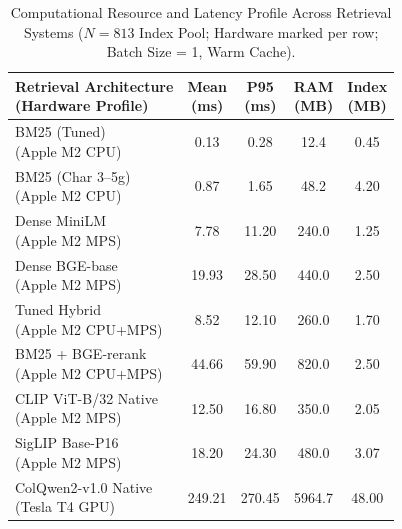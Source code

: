 \begin{table}[t]
\centering
\footnotesize
\caption{Computational Resource and Latency Profile Across Retrieval Systems ($N=813$ Index Pool; Hardware marked per row; Batch Size = 1, Warm Cache).}
\label{tab:system_costs}
\setlength{\tabcolsep}{2.5pt}
\begin{tabular}{@{}p{2.8cm}cccc@{}}
\toprule
\makecell[l]{\textbf{Retrieval Architecture}\\{\scriptsize \textbf{(Hardware Profile)}}} & \makecell{\textbf{Mean}\\\textbf{(ms)}} & \makecell{\textbf{P95}\\\textbf{(ms)}} & \makecell{\textbf{RAM}\\\textbf{(MB)}} & \makecell{\textbf{Index}\\\textbf{(MB)}} \\
\midrule
\makecell[l]{BM25 (Tuned)\\{\scriptsize (Apple M2 CPU)}}             & 0.13 & 0.28 & 12.4 & 0.45 \\
\makecell[l]{BM25 (Char 3--5g)\\{\scriptsize (Apple M2 CPU)}}        & 0.87 & 1.65 & 48.2 & 4.20 \\
\makecell[l]{Dense MiniLM\\{\scriptsize (Apple M2 MPS)}}             & 7.78 & 11.20 & 240.0 & 1.25 \\
\makecell[l]{Dense BGE-base\\{\scriptsize (Apple M2 MPS)}}           & 19.93 & 28.50 & 440.0 & 2.50 \\
\makecell[l]{Tuned Hybrid\\{\scriptsize (Apple M2 CPU+MPS)}}         & 8.52 & 12.10 & 260.0 & 1.70 \\
\makecell[l]{BM25 + BGE-rerank\\{\scriptsize (Apple M2 CPU+MPS)}}    & 44.66 & 59.90 & 820.0 & 2.50 \\
\makecell[l]{CLIP ViT-B/32 Native\\{\scriptsize (Apple M2 MPS)}}     & 12.50 & 16.80 & 350.0 & 2.05 \\
\makecell[l]{SigLIP Base-P16\\{\scriptsize (Apple M2 MPS)}}          & 18.20 & 24.30 & 480.0 & 3.07 \\
\makecell[l]{ColQwen2-v1.0 Native\\{\scriptsize (Tesla T4 GPU)}}     & 249.21 & 270.45 & 5964.7 & 48.00 \\
\bottomrule
\end{tabular}
\vspace*{20pt}
\end{table}

